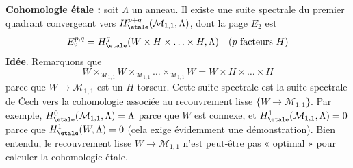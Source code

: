 \medskip\noindent
{\bf Cohomologie \'etale :} soit $\Lambda$ un anneau.
Il existe une suite spectrale du premier quadrant convergeant vers
$H^{p + q}_\etale(\mathcal{M}_{1, 1}, \Lambda)$, dont la page $E_2$ est
$$
E_2^{p, q} = H_\etale^q(W \times H \times \ldots \times H, \Lambda)
\quad(p\text{ facteurs }H)
$$
{\bf Idée}. Remarquons que
$$
W \times_{\mathcal{M}_{1, 1}} W \times_{\mathcal{M}_{1, 1}}
\ldots \times_{\mathcal{M}_{1, 1}} W
= W \times H \times \ldots \times H
$$
parce que $W \to \mathcal{M}_{1, 1}$ est un $H$-torseur. Cette suite
spectrale est la suite spectrale de {\v C}ech vers la cohomologie associée au
recouvrement lisse $\{W \to \mathcal{M}_{1, 1}\}$. Par exemple,
$H^0_\etale(\mathcal{M}_{1, 1}, \Lambda) = \Lambda$ parce que
$W$ est connexe, et $H^1_\etale(\mathcal{M}_{1, 1}, \Lambda) = 0$ parce que
$H^1_\etale(W, \Lambda) = 0$ (cela exige évidemment une démonstration).
Bien entendu, le recouvrement lisse $W \to \mathcal{M}_{1, 1}$ n'est
peut-être pas « optimal » pour calculer la cohomologie \'etale.




















